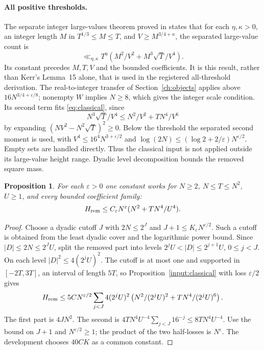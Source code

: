 \documentclass[11pt,a4paper,oneside]{article}
\newtheorem{proposition}[theorem]{Proposition}
\theoremstyle{definition}
\newcommand{\eps}{\varepsilon}
\numberwithin{equation}{section}
\begin{document}
\paragraph{All positive thresholds.}
The separate integer large-values theorem proved in \cite{Lewko} states that for each $\eta,\kappa>0$, an integer length $M$ in $T^{1/3}\le M\le T$, and $V\ge M^{3/4+\kappa}$, the separated large-value count is
\[
 \ll_{\eta,\kappa}T^\eta(M^2/V^2+M^3\sqrt T/V^4).
\]
Its constant precedes $M,T,V$ and the bounded coefficients. It is this result, rather than Kerr's Lemma~15 alone, that is used in the registered all-threshold derivation.
The real-to-integer transfer of Section~\ref{ch:objects} applies above
$16N^{3/4+\eps/8}$; nonempty $W$ implies $N\ge8$, which gives the integer
scale condition. Its second term fits \eqref{eq:classical}, since
\[
 N^3\sqrt T/V^4\le N^2/V^2+TN^4/V^6
\]
by expanding $(NV^2-N^2\sqrt T)^2\ge0$.
Below the threshold the separated second moment is used, with
$V^4\le16^4N^{3+\eps/2}$ and
$\log(2N)\le(\log2+2/\eps)N^{\eps/2}$.
Empty sets are handled directly. Thus the classical input is not applied
outside its large-value height range.
Dyadic level decomposition bounds the removed square mass.
\begin{proposition}\label{prop:removed}
For each $\eps>0$ one constant works for $N\ge2$, $N\le T\le N^2$,
$U\ge1$, and every bounded coefficient family:
\begin{equation*}
 H_{\rm rem}\le C_\eps N^\eps(N^2+TN^4/U^4).
\end{equation*}
\end{proposition}
\begin{proof}
Choose a dyadic cutoff $J$ with $2N\le2^J$ and
$J+1\le K_\eps N^{\eps/2}$. Such a cutoff is obtained from the least
dyadic cover and the logarithmic power bound. Since $|D|\le2N\le2^JU$,
split the removed part into levels $2^jU<|D|\le2^{j+1}U$, $0\le j<J$.
On each level $|D|^2\le4(2^jU)^2$. The cutoff is at most one and supported
in $[-2T,3T]$, an interval of length $5T$, so Proposition~\ref{input:classical}
with loss $\eps/2$ gives
\[
 H_{\rm rem}\le5C N^{\eps/2}\sum_{j<J}
 4(2^jU)^2\left(N^2/(2^jU)^2+TN^4/(2^jU)^6\right).
\]
The first part is $4JN^2$. The second is
$4TN^4U^{-4}\sum_{j<J}16^{-j}\le8TN^4U^{-4}$.
Use the bound on $J+1$ and $N^{\eps/2}\ge1$; the product of the two
half-losses is $N^\eps$. The development chooses $40CK$ as a common constant.
\end{proof}
\end{document}
